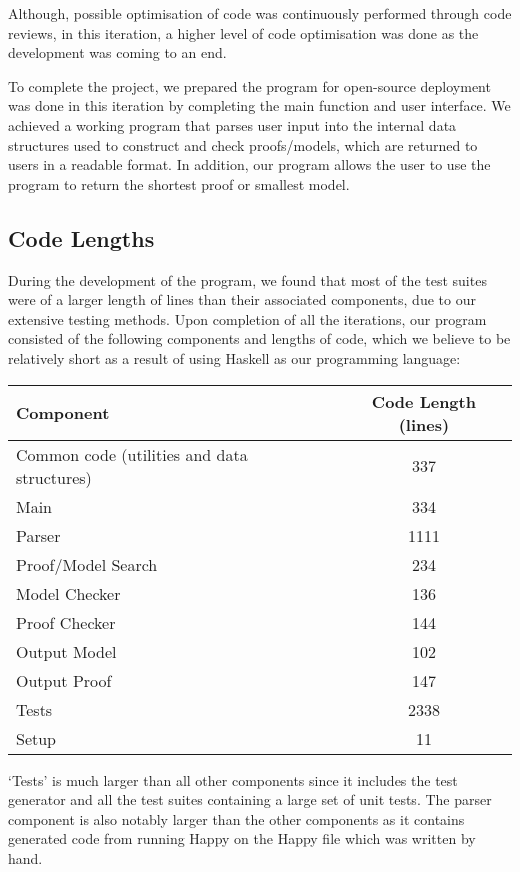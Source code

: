 Although, possible optimisation of code was continuously performed through code reviews, in this iteration, a higher level of code optimisation was done as the development was coming to an end.

To complete the project, we prepared the program for open-source deployment was done in this iteration by completing the main function and user interface. We achieved a working program that parses user input into the internal data structures used to construct and check proofs/models, which are returned to users in a readable format. In addition, our program allows the user to use the program to return the shortest proof or smallest model.


\subsection{Code Lengths}

During the development of the program, we found that most of the test suites were of a larger length of lines than their associated components, due to our extensive testing methods. Upon completion of all the iterations, our program consisted of the following components and lengths of code, which we believe to be relatively short as a result of using Haskell as our programming language:

\begin{center}
  \begin{tabular}{|l|c|}
\hline
\textbf{Component} & \textbf{Code Length (lines)} \\
\hline
Common code (utilities and data structures) & 337\\
\hline
Main & 334\\
\hline
Parser & 1111\\
\hline
Proof/Model Search & 234\\
\hline
Model Checker & 136\\
\hline
Proof Checker & 144\\
\hline
Output Model & 102\\
\hline
Output Proof & 147\\
\hline
Tests & 2338\\
\hline
Setup & 11\\
\hline
\end{tabular}
\end{center}

`Tests' is much larger than all other components since it includes the test generator and all the test suites containing a large set of unit tests. The parser component is also notably larger than the other components as it contains generated code from running Happy on the Happy file which was written by hand.
